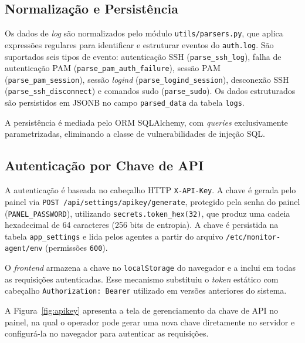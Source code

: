 \documentclass[
    12pt
    ,oneside
    ,a4paper
    ,chapter=TITLE
    ,section=TITLE
    ,sumario=abnt-6027-2012]{abntex2}
\begin{document}
\subsection{Normalização e Persistência}
\label{subsec:persistencia}

Os dados de \textit{log} são normalizados pelo módulo
\texttt{utils/parsers.py}, que aplica expressões regulares para identificar e
estruturar eventos do \texttt{auth.log}. São suportados seis tipos de evento:
autenticação SSH (\texttt{parse\_ssh\_log}), falha de autenticação PAM
(\texttt{parse\_pam\_auth\_failure}), sessão PAM (\texttt{parse\_pam\_session}),
sessão \textit{logind} (\texttt{parse\_logind\_session}), desconexão SSH
(\texttt{parse\_ssh\_disconnect}) e comandos sudo (\texttt{parse\_sudo}). Os dados
estruturados são persistidos em JSONB no campo \texttt{parsed\_data} da tabela
\texttt{logs}.

A persistência é mediada pelo ORM SQLAlchemy, com \textit{queries} exclusivamente
parametrizadas, eliminando a classe de vulnerabilidades de injeção SQL.

\subsection{Autenticação por Chave de API}
\label{subsec:autenticacao}

A autenticação é baseada no cabeçalho HTTP \texttt{X-API-Key}. A chave é gerada
pelo painel via \texttt{POST /api/settings/apikey/generate}, protegido pela senha
do painel (\texttt{PANEL\_PASSWORD}), utilizando \texttt{secrets.token\_hex(32)},
que produz uma cadeia hexadecimal de 64 caracteres (256 bits de entropia). A chave é
persistida na tabela \texttt{app\_settings} e lida pelos agentes a partir do arquivo
\texttt{/etc/monitor-agent/env} (permissões \texttt{600}).

O \textit{frontend} armazena a chave no \texttt{localStorage} do navegador e a
inclui em todas as requisições autenticadas. Esse mecanismo substituiu o
\textit{token} estático com cabeçalho \texttt{Authorization: Bearer} utilizado em
versões anteriores do sistema.

A Figura~\ref{fig:apikey} apresenta a tela de gerenciamento da chave de API no painel, na qual o operador pode gerar uma nova chave diretamente no servidor e configurá-la no navegador para autenticar as requisições.

\begin{figure}[H]
\end{figure}
\end{document}
